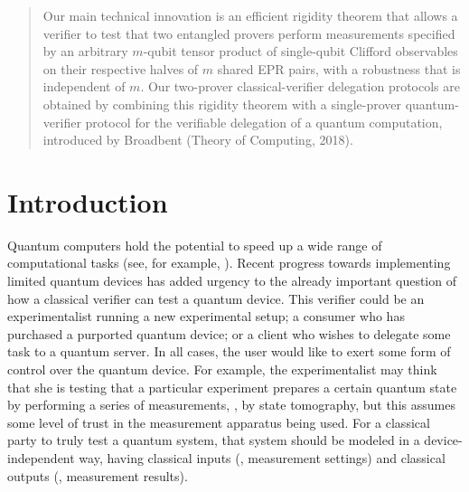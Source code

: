 \documentclass{toc}
\begin{document}
\begin{frontmatter}
\begin{abstract}
Our main technical innovation is an efficient rigidity theorem that allows a verifier to test that two entangled provers perform measurements specified by an arbitrary $m$-qubit tensor product of single-qubit Clifford observables on their respective halves of $m$ shared EPR pairs, with a robustness that is independent of $m$. Our two-prover classical-verifier delegation protocols are obtained by combining this rigidity theorem with a single-prover quantum-verifier protocol for the verifiable delegation of a quantum computation, introduced by Broadbent (Theory of Computing, 2018). \end{abstract}

\iffalse 

\tocarxivcategory{quantu-ph,cs.CC,cs.CR}

\fi 

\end{frontmatter}


\section{Introduction}

Quantum computers hold the potential to speed up a wide range of computational tasks (see, for example, \cite{montanaro2016survey}). Recent progress towards implementing limited quantum devices has added urgency to the already important question of how a classical verifier can test a quantum device. This verifier could be an experimentalist running a new experimental setup; a consumer who has purchased a purported quantum device; or a client who wishes to delegate some task to a quantum server. In all cases, the user would like to exert some form of control over the quantum device. For example, the experimentalist may think that she is testing that a particular experiment prepares a certain quantum state by performing a series of measurements, \ie, by state tomography, but this assumes some level of trust in the measurement apparatus being used.  For a classical party to truly test a quantum system, that system should be modeled in a device-independent way, having classical inputs (\eg, measurement settings) and classical outputs (\eg, measurement results). 
\end{document}
